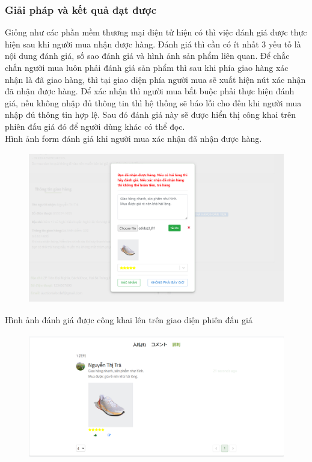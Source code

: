 \documentclass{article}
\begin{document}
\subsubsection{Giải pháp và kết quả đạt được}
Giống như các phần mềm thương mại điện tử hiện có thì việc đánh giá được thực hiện sau khi người mua nhận được hàng. Đánh giá thì cần có ít nhất 3 yếu tố là nội dung đánh giá, số sao đánh giá và hình ảnh sản phẩm liên quan. Để chắc chắn người mua luôn phải đánh giá sản phẩm thì sau khi phía giao hàng xác nhận là đã giao hàng, thì tại giao diện phía người mua sẽ xuất hiện nút xác nhận đã nhận được hàng. Để xác nhận thì người mua bắt buộc phải thực hiện đánh giá, nếu không nhập đủ thông tin thì hệ thống sẽ báo lỗi cho đến khi người mua nhập đủ thông tin hợp lệ. Sau đó đánh giá này sẽ được hiển thị công khai trên phiên đấu giá đó để người dùng khác có thể đọc.\\
Hình ảnh form đánh giá khi người mua xác nhận đã nhận được hàng.
\begin{figure}[H]
    \centering
    \includegraphics[width=11.4cm,height=6.62cm]{images/rate.png}
\end{figure}
Hình ảnh đánh giá được công khai lên trên giao diện phiên đấu giá
\begin{figure}[H]
    \centering
    \includegraphics[width=11.4cm,height=5.46cm]{images/listrate.png}
\end{figure}
\newpage
\end{document}
